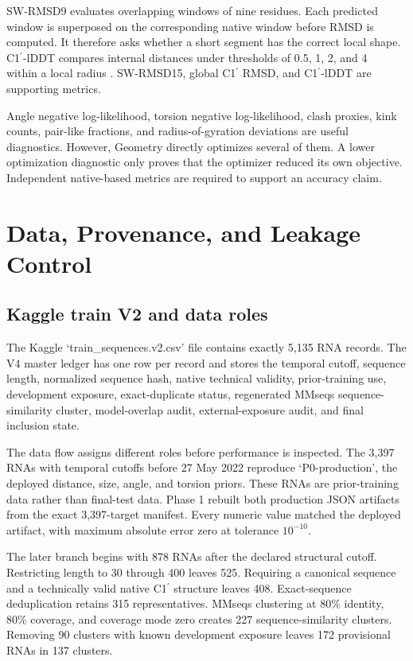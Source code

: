 \documentclass[12pt,a4paper,oneside]{report}
\newcommand{\cprime}{C1$^{\prime}$}
\newcommand{\angstrom}{\text{\AA}}
\begin{document}
SW-RMSD9 evaluates overlapping windows of nine residues. Each predicted window is
superposed on the corresponding native window before RMSD is computed. It therefore
asks whether a short segment has the correct local shape. C1$^{\prime}$-lDDT compares
internal distances under thresholds of 0.5, 1, 2, and 4~\angstrom{} within a local
radius \cite{lddt}. SW-RMSD15, global \cprime{} RMSD, and \cprime{}-lDDT are supporting
metrics.

Angle negative log-likelihood, torsion negative log-likelihood, clash proxies, kink
counts, pair-like fractions, and radius-of-gyration deviations are useful diagnostics.
However, Geometry directly optimizes several of them. A lower optimization diagnostic
only proves that the optimizer reduced its own objective. Independent native-based
metrics are required to support an accuracy claim.

\chapter{Data, Provenance, and Leakage Control}

\section{Kaggle train V2 and data roles}

The Kaggle `train\_sequences.v2.csv' file contains exactly 5,135 RNA records. The V4
master ledger has one row per record and stores the temporal cutoff, sequence length,
normalized sequence hash, native technical validity, prior-training use, development
exposure, exact-duplicate status, regenerated MMseqs sequence-similarity cluster,
model-overlap audit, external-exposure audit, and final inclusion state.

The data flow assigns different roles before performance is inspected. The 3,397 RNAs
with temporal cutoffs before 27 May 2022 reproduce `P0-production', the deployed
distance, size, angle, and torsion priors. These RNAs are prior-training data rather
than final-test data. Phase 1 rebuilt both production JSON artifacts from the exact
3,397-target manifest. Every numeric value matched the deployed artifact, with maximum
absolute error zero at tolerance $10^{-10}$.

The later branch begins with 878 RNAs after the declared structural cutoff. Restricting
length to 30 through 400 leaves 525. Requiring a canonical sequence and a technically
valid native \cprime{} structure leaves 408. Exact-sequence deduplication retains 315
representatives. MMseqs clustering at 80\% identity, 80\% coverage, and coverage mode
zero creates 227 sequence-similarity clusters. Removing 90 clusters with known
development exposure leaves 172 provisional RNAs in 137 clusters.
\end{document}
